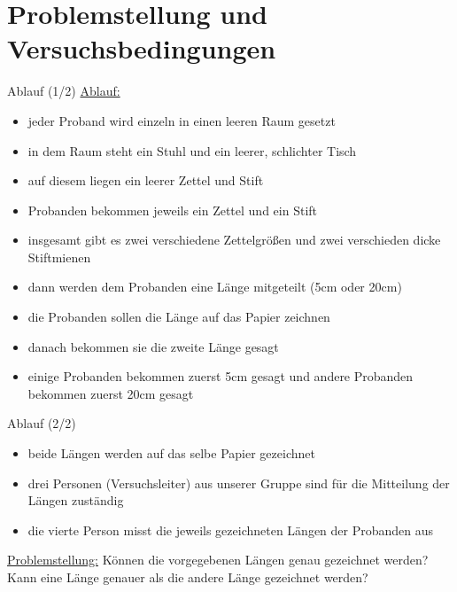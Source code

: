\documentclass[ ngerman, fontsize= 10pt, headings=big, titlepage=true, xcolor=dvipsnames]{beamer}
\begin{document}
\section{Problemstellung und Versuchsbedingungen}
\begin{frame}{Ablauf (1/2)}
\underline{Ablauf:}
\begin{itemize}
\item jeder Proband wird einzeln in einen leeren Raum gesetzt
\item in dem Raum steht ein Stuhl und ein leerer, schlichter Tisch 
\item auf diesem liegen ein leerer Zettel und Stift
\item Probanden bekommen jeweils ein Zettel und ein Stift
\item insgesamt gibt es zwei verschiedene Zettelgrößen und zwei verschieden dicke Stiftmienen
\item dann werden dem Probanden eine Länge mitgeteilt (5cm oder 20cm)
\item die Probanden sollen die Länge auf das Papier zeichnen
\item danach bekommen sie die zweite Länge gesagt
\item einige Probanden bekommen zuerst 5cm gesagt und andere Probanden bekommen zuerst 20cm gesagt



\end{itemize}
	
\end{frame}
\begin{frame}{Ablauf (2/2)}
\begin{itemize}
\item beide Längen werden auf das selbe Papier gezeichnet 
\item drei Personen (Versuchsleiter) aus unserer Gruppe sind für die Mitteilung der Längen zuständig 
\item die vierte Person misst die jeweils gezeichneten Längen der Probanden aus
\end{itemize}
\underline{Problemstellung:}\newline
Können die vorgegebenen Längen genau gezeichnet werden? \newline
Kann eine Länge genauer als die andere Länge gezeichnet werden?

\end{frame}
\end{document}
